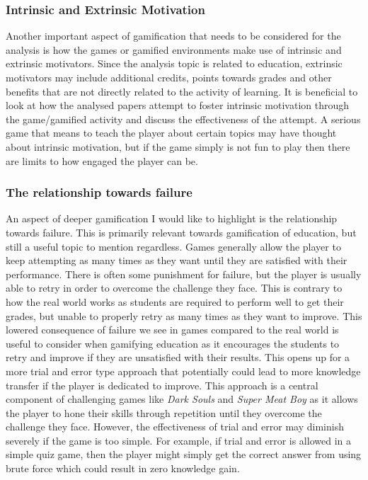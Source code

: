 \subsubsection{Intrinsic and Extrinsic Motivation}
Another important aspect of gamification that needs to be considered for the analysis is how the games or gamified environments make use of intrinsic and extrinsic motivators. Since the analysis topic is related to education, extrinsic motivators may include additional credits, points towards grades and other benefits that are not directly related to the activity of learning. It is beneficial to look at how the analysed papers attempt to foster intrinsic motivation through the game/gamified activity and discuss the effectiveness of the attempt. A serious game that means to teach the player about certain topics may have thought about intrinsic motivation, but if the game simply is not fun to play then there are limits to how engaged the player can be. 


\subsubsection{The relationship towards failure}
An aspect of deeper gamification I would like to highlight is the relationship towards failure. This is primarily relevant towards gamification of education, but still a useful topic to mention regardless. Games generally allow the player to keep attempting as many times as they want until they are satisfied with their performance. There is often some punishment for failure, but the player is usually able to retry in order to overcome the challenge they face. This is contrary to how the real world works as students are required to perform well to get their grades, but unable to properly retry as many times as they want to improve. This lowered consequence of failure we see in games compared to the real world is useful to consider when gamifying education as it encourages the students to retry and improve if they are unsatisfied with their results. 
This opens up for a more trial and error type approach that potentially could lead to more knowledge transfer if the player is dedicated to improve. This approach is a central component of challenging games like \emph{Dark Souls} and \emph{Super Meat Boy} as it allows the player to hone their skills through repetition until they overcome the challenge they face. However, the effectiveness of trial and error may diminish severely if the game is too simple. For example, if trial and error is allowed in a simple quiz game, then the player might simply get the correct answer from using brute force which could result in zero knowledge gain.

